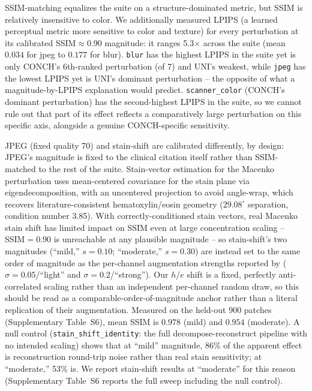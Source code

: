 \documentclass[11pt]{article}
\begin{document}
SSIM-matching equalizes the suite on a structure-dominated metric, but SSIM is relatively insensitive to color. We additionally measured LPIPS \citep{lpips_2018} (a learned perceptual metric more sensitive to color and texture) for every perturbation at its calibrated SSIM$\approx$0.90 magnitude: it ranges 5.3$\times$ across the suite (mean $0.034$ for jpeg to $0.177$ for blur). \texttt{blur} has the highest LPIPS in the suite yet is only CONCH's 6th-ranked perturbation (of 7) and UNI's weakest, while \texttt{jpeg} has the lowest LPIPS yet is UNI's dominant perturbation -- the opposite of what a magnitude-by-LPIPS explanation would predict. \texttt{scanner\_color} (CONCH's dominant perturbation) has the second-highest LPIPS in the suite, so we cannot rule out that part of its effect reflects a comparatively large perturbation on this specific axis, alongside a genuine CONCH-specific sensitivity.

JPEG (fixed quality 70) and stain-shift are calibrated differently, by design: JPEG's magnitude is fixed to the clinical citation itself rather than SSIM-matched to the rest of the suite. Stain-vector estimation for the Macenko perturbation uses mean-centered covariance for the stain plane via eigendecomposition, with an uncentered projection to avoid angle-wrap, which recovers literature-consistent hematoxylin/eosin geometry ($29.08^{\circ}$ separation, condition number 3.85). With correctly-conditioned stain vectors, real Macenko stain shift has limited impact on SSIM even at large concentration scaling -- SSIM$=$0.90 is unreachable at any plausible magnitude -- so stain-shift's two magnitudes (``mild,'' $s=0.10$; ``moderate,'' $s=0.30$) are instead set to the same order of magnitude as the per-channel augmentation strengths reported by \citet{tellez2019_stainaug} ($\sigma=0.05$/``light'' and $\sigma=0.2$/``strong''). Our $h$/$e$ shift is a fixed, perfectly anti-correlated scaling rather than an independent per-channel random draw, so this should be read as a comparable-order-of-magnitude anchor rather than a literal replication of their augmentation. Measured on the held-out 900 patches (Supplementary Table~S6), mean SSIM is $0.978$ (mild) and $0.954$ (moderate). A null control (\texttt{stain\_shift\_identity}: the full decompose-reconstruct pipeline with no intended scaling) shows that at ``mild'' magnitude, 86\% of the apparent effect is reconstruction round-trip noise rather than real stain sensitivity; at ``moderate,'' 53\% is. We report stain-shift results at ``moderate'' for this reason (Supplementary Table~S6 reports the full sweep including the null control).
\end{document}
